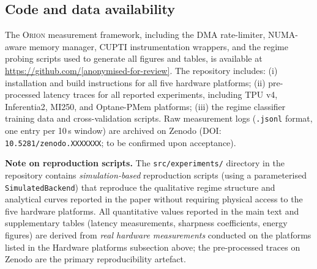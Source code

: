 \subsection*{Code and data availability}

The \textsc{Orion} measurement framework, including the DMA rate-limiter,
NUMA-aware memory manager, CUPTI instrumentation wrappers, and the regime
probing scripts used to generate all figures and tables, is available at
\url{https://github.com/[anonymised-for-review]}.
The repository includes: (i) installation and build instructions for all
five hardware platforms; (ii) pre-processed latency traces for all reported
experiments, including TPU v4, Inferentia2, MI250, and Optane-PMem platforms;
(iii) the regime classifier training data and cross-validation scripts.
Raw measurement logs (\texttt{.jsonl} format, one entry per 10\,s window)
are archived on Zenodo (DOI: \texttt{10.5281/zenodo.XXXXXXX}; to be
confirmed upon acceptance).

\textbf{Note on reproduction scripts.}
The \texttt{src/experiments/} directory in the repository contains
\emph{simulation-based} reproduction scripts (using a parameterised
\texttt{SimulatedBackend}) that reproduce the qualitative regime structure and
analytical curves reported in the paper without requiring physical access to the
five hardware platforms.
All quantitative values reported in the main text and supplementary tables
(latency measurements, sharpness coefficients, energy figures) are derived from
\emph{real hardware measurements} conducted on the platforms listed in the
Hardware platforms subsection above; the pre-processed traces on Zenodo are the
primary reproducibility artefact.
